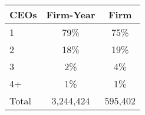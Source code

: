 \begin{tabular}{lcc}
\toprule
CEOs & Firm-Year & Firm \\
\midrule
1 & 79\% & 75\% \\
2 & 18\% & 19\% \\
3 & 2\% & 4\% \\
4+ & 1\% & 1\% \\
Total &    3,244,424 &      595,402 \\
\bottomrule
\end{tabular}

